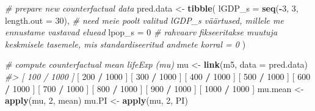 \documentclass[]{book}
\newenvironment{Shaded}{\begin{snugshade}}{\end{snugshade}}
\newcommand{\CommentTok}[1]{\textcolor[rgb]{0.56,0.35,0.01}{\textit{#1}}}
\newcommand{\DataTypeTok}[1]{\textcolor[rgb]{0.13,0.29,0.53}{#1}}
\newcommand{\DecValTok}[1]{\textcolor[rgb]{0.00,0.00,0.81}{#1}}
\newcommand{\KeywordTok}[1]{\textcolor[rgb]{0.13,0.29,0.53}{\textbf{#1}}}
\newcommand{\NormalTok}[1]{#1}
\newcommand{\OperatorTok}[1]{\textcolor[rgb]{0.81,0.36,0.00}{\textbf{#1}}}
\newcommand{\StringTok}[1]{\textcolor[rgb]{0.31,0.60,0.02}{#1}}
\begin{document}
\begin{Shaded}
\begin{Highlighting}[]
\CommentTok{# prepare new counterfactual data}
\NormalTok{pred.data <-}\StringTok{ }\KeywordTok{tibble}\NormalTok{(}
    \DataTypeTok{lGDP_s =} \KeywordTok{seq}\NormalTok{(}\OperatorTok{-}\DecValTok{3}\NormalTok{, }\DecValTok{3}\NormalTok{, }\DataTypeTok{length.out =} \DecValTok{30}\NormalTok{), }\CommentTok{# need meie poolt valitud lGDP_s väärtused, millele me ennustame vastavad eluead }
    \DataTypeTok{lpop_s =} \DecValTok{0} \CommentTok{# rahvaarv fikseeritakse muutuja keskmisele tasemele, mis standardiseeritud andmete korral = 0}
\NormalTok{)}

\CommentTok{# compute counterfactual mean lifeExp (mu)}
\NormalTok{mu <-}\StringTok{ }\KeywordTok{link}\NormalTok{(m5, }\DataTypeTok{data =}\NormalTok{ pred.data)}
\CommentTok{#> [ 100 / 1000 ]}
\NormalTok{[ }\DecValTok{200} \OperatorTok{/}\StringTok{ }\DecValTok{1000}\NormalTok{ ]}
\NormalTok{[ }\DecValTok{300} \OperatorTok{/}\StringTok{ }\DecValTok{1000}\NormalTok{ ]}
\NormalTok{[ }\DecValTok{400} \OperatorTok{/}\StringTok{ }\DecValTok{1000}\NormalTok{ ]}
\NormalTok{[ }\DecValTok{500} \OperatorTok{/}\StringTok{ }\DecValTok{1000}\NormalTok{ ]}
\NormalTok{[ }\DecValTok{600} \OperatorTok{/}\StringTok{ }\DecValTok{1000}\NormalTok{ ]}
\NormalTok{[ }\DecValTok{700} \OperatorTok{/}\StringTok{ }\DecValTok{1000}\NormalTok{ ]}
\NormalTok{[ }\DecValTok{800} \OperatorTok{/}\StringTok{ }\DecValTok{1000}\NormalTok{ ]}
\NormalTok{[ }\DecValTok{900} \OperatorTok{/}\StringTok{ }\DecValTok{1000}\NormalTok{ ]}
\NormalTok{[ }\DecValTok{1000} \OperatorTok{/}\StringTok{ }\DecValTok{1000}\NormalTok{ ]}
\NormalTok{mu.mean <-}\StringTok{ }\KeywordTok{apply}\NormalTok{(mu, }\DecValTok{2}\NormalTok{, mean)}
\NormalTok{mu.PI <-}\StringTok{ }\KeywordTok{apply}\NormalTok{(mu, }\DecValTok{2}\NormalTok{, PI)}


\end{Highlighting}
\end{Shaded}
\end{document}
